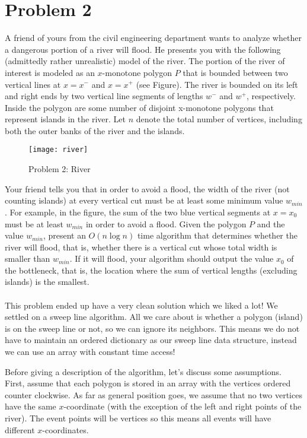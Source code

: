 \documentclass[11pt]{article}
\begin{document}
\newpage
\section*{Problem 2}

A friend of yours from the civil engineering department wants to analyze whether
a dangerous portion of a river will flood. He presents you with the following
(admittedly rather unrealistic) model of the river. The portion of the river of
interest is modeled as an $x$-monotone polygon $P$ that is bounded between two
vertical lines at $x = x^-$ and $x = x^+$ (see Figure). The river is bounded on
its left and right ends by two vertical line segments of lengths $w^-$ and
$w^+$, respectively. Inside the polygon are some number of disjoint x-monotone
polygons that represent islands in the river.  Let $n$ denote the total number
of vertices, including both the outer banks of the river and the islands.

\begin{figure}[h]
    \centering
    \texttt{[image: river]}
    \caption{Problem 2: River}
\end{figure}

Your friend tells you that in order to avoid a flood, the width of the river
(not counting islands) at every vertical cut must be at least some minimum value
$w_{min}$. For example, in the figure, the sum of the two blue vertical segments
at $x = x_0$ must be at least $w_{min}$ in order to avoid a flood.  Given the
polygon $P$ and the value $w_{min}$, present an $O(n \log n)$ time algorithm that
determines whether the river will flood, that is, whether there is a vertical
cut whose total width is smaller than $w_{min}$. If it will flood, your algorithm
should output the value $x_0$ of the bottleneck, that is, the location where the
sum of vertical lengths (excluding islands) is the smallest. \\\\
\answer
This problem ended up have a very clean solution which we liked a lot!
We settled on a sweep line algorithm.
All we care about is whether a polygon (island) is on the sweep line or not, so we can ignore its neighbors.
This means we do not have to maintain an ordered dictionary as our sweep line data structure, instead we can use an array with constant time access!

Before giving a description of the algorithm, let's discuss some assumptions.
First, assume that each polygon is stored in an array with the vertices ordered counter clockwise.
As far as general position goes, we assume that no two vertices have the same $x$-coordinate (with the exception of the left and right points of the river).
The event points will be vertices so this means all events will have different $x$-coordinates.
\end{document}
